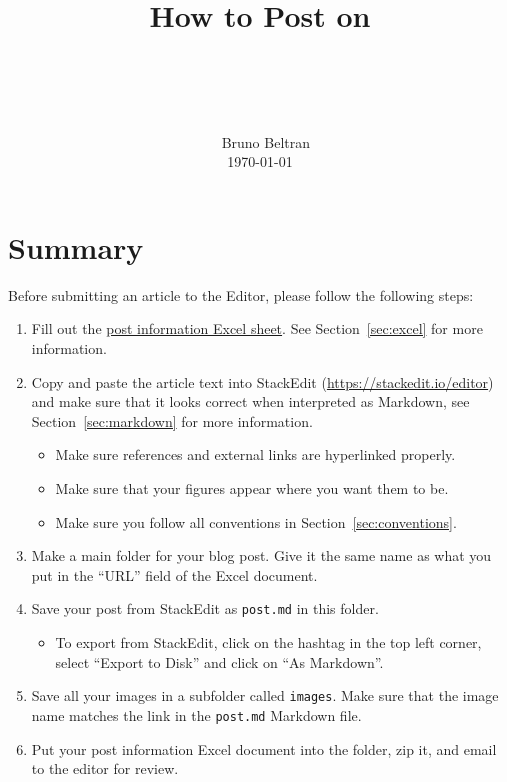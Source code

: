 \documentclass[paper=a4, fontsize=11pt]{scrartcl}
\title{\
        \usefont{OT1}{bch}{b}{n}
        \horrule{0.5pt} \\[0.4cm]
        \huge How to Post on \\ \dishurl{} \\
        \horrule{2pt} \\[0.5cm]
}
\author{\
        \normalfont{}                     \normalsize
        Bruno Beltran\\[-3pt]             \normalsize
        \today
}
\date{}
\numberwithin{equation}{section}        %
\numberwithin{figure}{section}            %
\numberwithin{table}{section}                %
\newcommand{\dishurlplain}[1]{http://thedishonscience.stanford.edu/#1}
\begin{document}
\maketitle

\section{Summary}
Before submitting an article to the Editor, please follow the following steps:
\begin{enumerate}
    \item Fill out the
        \href{\dishurlplain{documents/post\_info.xlsx}}{post information
            Excel sheet}. See Section~\ref{sec:excel} for more information.
    \item Copy and paste the article text into StackEdit
    (\url{https://stackedit.io/editor}) and make sure that it looks
    correct when interpreted as Markdown, see Section~\ref{sec:markdown} for more
    information.
        \begin{itemize}
            \item Make sure references and external links are hyperlinked
                properly.
            \item Make sure that your figures appear where you want them to be.
            \item Make sure you follow all conventions in
                Section~\ref{sec:conventions}.
        \end{itemize}
    \item Make a main folder for your blog post. Give it the same name as what
        you put in the ``URL'' field of the Excel document.

    \item Save your post from StackEdit as \texttt{post.md} in this folder.
        \begin{itemize}
            \item To export from StackEdit, click on the hashtag in the top left
                corner, select ``Export to Disk'' and click on ``As Markdown''.
        \end{itemize}
    \item Save all your images in a subfolder called \texttt{images}. Make sure
        that the image name matches the link in the \texttt{post.md} Markdown
        file.
    \item Put your post information Excel document into the folder, zip it, and
        email to the editor for review.
\end{enumerate}
\end{document}

